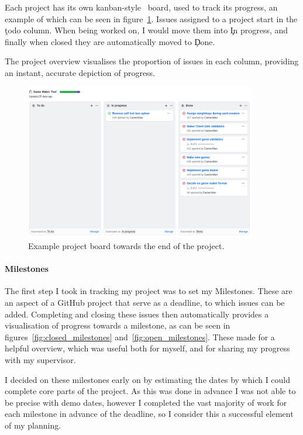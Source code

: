 Each project has its own kanban-style~\cite{KBAN} board, used to track its progress, an example of which can be seen in figure~\ref{fig:board}. Issues assigned to a project start in the \c{todo} column. When being worked on, I would move them into \c{In progress}, and finally when closed they are automatically moved to \c{Done}.

The project overview visualises the proportion of issues in each column, providing an instant, accurate depiction of progress.

\begin{figure}[!h]
	\centering
	\includegraphics[width=0.9\textwidth]{./images/softeng/board.png}
	\caption{Example project board towards the end of the project.}
	\label{fig:board}
\end{figure}

\paragraph{Milestones} The first step I took in tracking my project was to set my Milestones. These are an aspect of a GitHub project that serve as a deadline, to which issues can be added. 
Completing and closing these issues then automatically provides a visualisation of progress towards a milestone, as can be seen in figures~\ref{fig:closed_milestones} and~\ref{fig:open_milestones}. 
These made for a helpful overview, which was useful both for myself, and for sharing my progress with my supervisor.

I decided on these milestones early on by estimating the dates by which I could complete core parts of the project. As this was done in advance I was not able to be precise with demo dates, however I completed the vast majority of work for each milestone in advance of the deadline, so I consider this a successful element of my planning.


